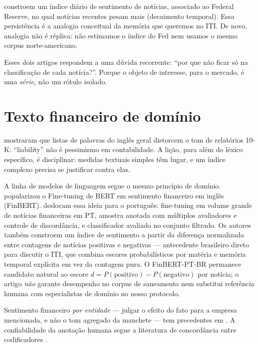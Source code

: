  constroem um índice diário de sentimento de notícias, associado ao Federal Reserve, no qual notícias recentes pesam mais (decaimento temporal). Essa persistência é a analogia conceitual da memória que queremos no ITI. De novo, analogia não é réplica: não estimamos o índice do Fed nem usamos o mesmo corpus norte-americano.

Esses dois artigos respondem a uma dúvida recorrente: ``por que não ficar só na classificação de cada notícia?''. Porque o objeto de interesse, para o mercado, é uma \emph{série}, não um rótulo isolado.

\section{Texto financeiro de domínio}

 mostraram que listas de palavras do inglês geral distorcem o tom de relatórios 10-K: ``liability'' não é pessimismo em contabilidade. A lição, para além do léxico específico, é disciplinar: medidas textuais simples têm lugar, e um índice complexo precisa se justificar contra elas.

A linha de modelos de linguagem segue o mesmo princípio de domínio.  popularizou o Fine-tuning de BERT em sentimento financeiro em inglês (FinBERT).  deslocam essa ideia para o português: fine-tuning em volume grande de notícias financeiras em PT, amostra anotada com múltiplos avaliadores e controle de discordância, e classificador avaliado no conjunto filtrado. Os autores também constroem um índice de sentimento a partir da diferença normalizada entre contagens de notícias positivas e negativas --- antecedente brasileiro direto para discutir o ITI, que combina escores probabilísticos por matéria e memória temporal explícita em vez da contagem pura. O FinBERT-PT-BR permanece candidato natural ao escore \(d = P(\mathrm{positivo}) - P(\mathrm{negativo})\) por notícia; o artigo \emph{não} garante desempenho no corpus de saneamento nem substitui referência humana com especialistas de domínio no nosso protocolo.

Sentimento financeiro \emph{por entidade} --- julgar o efeito do fato para a empresa mencionada, e não o tom agregado da manchete --- tem precedentes em . A confiabilidade da anotação humana segue a literatura de concordância entre codificadores .

